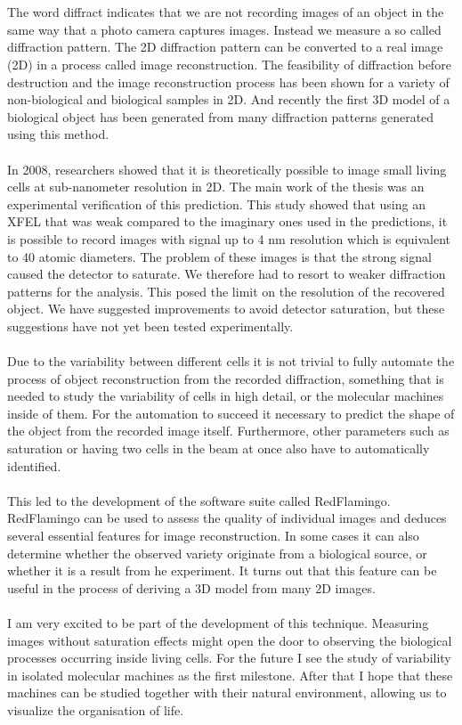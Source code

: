 \\\\
The word diffract indicates that we are not recording images of an object in the same way that a photo camera captures images. Instead we measure a so called diffraction pattern. The 2D diffraction pattern can be converted to a real image (2D) in a process called image reconstruction. The feasibility of diffraction before destruction and the image reconstruction process has been shown for a variety of non-biological and biological samples in 2D.  And recently the first 3D model of a biological object has been generated from many diffraction patterns generated using this method.
\\\\
In 2008, researchers showed that it is theoretically possible to image small living cells at sub-nanometer resolution in 2D. The main work of the thesis was an experimental verification of this prediction. This study showed that using an XFEL that was weak compared to the imaginary ones used in the predictions, it is possible to record images with signal up to 4 nm resolution which is equivalent to 40 atomic diameters. The problem of these images is that the strong signal caused the detector to saturate. We therefore had to resort to weaker diffraction patterns for the analysis. This posed the limit on the resolution of the recovered object. We have suggested improvements to avoid detector saturation, but these suggestions have not yet been tested experimentally.
\\\\
Due to the variability between different cells it is not trivial to fully automate the process of object reconstruction from the recorded diffraction, something that is needed to study the variability of cells in high detail, or the molecular machines inside of them. For the automation to succeed it necessary to predict the shape of the object from the recorded image itself. Furthermore, other parameters such as saturation or having two cells in the beam at once also have to automatically identified.
\\\\
This led to the development of the software suite called RedFlamingo. RedFlamingo can be used to assess the quality of individual images and deduces several essential features for image reconstruction. In some cases it can also determine whether the observed variety originate from a biological source, or whether it is a result from he experiment. It turns out that this feature can be useful in the process of deriving a 3D model from many 2D images. 
\\\\
I am very excited to be part of the development of this technique. Measuring images without saturation effects might open the door to observing the biological processes occurring inside living cells. For the future I see the study of variability in isolated molecular machines as the first milestone. After that I hope that these machines can be studied together with their natural environment, allowing us to visualize the organisation of life.
